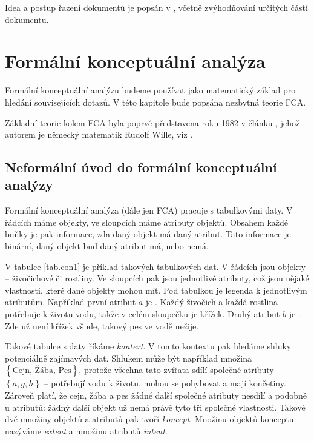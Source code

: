 \documentclass[12pt]{article}
\newcommand{\ssection}[1]{\subsection{#1}}
\newcommand{\adds}[1]{\left\{#1\right\}}
\newcommand{\strong}[1]{{\em #1}}
\begin{document}
Idea a postup řazení dokumentů je popsán v \cite{introir}, včetně zvýhodňování určitých částí dokumentu. 






\newpage
\section{Formální konceptuální analýza}
Formální konceptuální analýzu budeme používat jako matematický základ pro hledání souvisejících dotazů. V této kapitole bude popsána nezbytná teorie FCA. 

Základní teorie kolem FCA byla poprvé představena roku 1982 v článku , jehož autorem je německý matematik Rudolf Wille, viz \cite{wille}.

\ssection{Neformální úvod do formální konceptuální analýzy}
Formální konceptuální analýza (dále jen FCA) pracuje s tabulkovými daty. V řádcích máme objekty, ve sloupcích máme atributy objektů. Obsahem každé buňky je pak informace, zda daný objekt má daný atribut. Tato informace je binární, daný objekt buď daný atribut má, nebo nemá. 

V tabulce \ref{tab.con1} je příklad takových tabulkových dat. V řádcích jsou objekty -- živočichové či rostliny. Ve sloupcích pak jsou jednotlivé atributy, což jsou nějaké vlastnosti, které dané objekty mohou mít. Pod tabulkou je legenda k jednotlivým atributům. Například první atribut $a$ je . Každý živočich a každá rostlina potřebuje k životu vodu, takže v celém sloupečku je křížek. Druhý atribut $b$ je . Zde už není křížek všude, takový pes ve vodě nežije. 


Takové tabulce s daty říkáme \strong{kontext}. V tomto kontextu pak hledáme shluky potenciálně zajímavých dat. Shlukem může být například množina $\adds{\mbox{Cejn, Žába, Pes}}$, protože všechna tato zvířata sdílí společné atributy $\adds{a, g, h}$ -- potřebují vodu k životu, mohou se pohybovat a mají končetiny. Zároveň platí, že cejn, žába a pes žádné další společné atributy nesdílí a podobně u atributů: žádný další objekt už nemá právě tyto tři společné vlastnosti. Takové dvě množiny objektů a atributů pak tvoří \strong{koncept}. Množinu objektů konceptu nazýváme \strong{extent} a množinu atributů \strong{intent}. 
\end{document}
